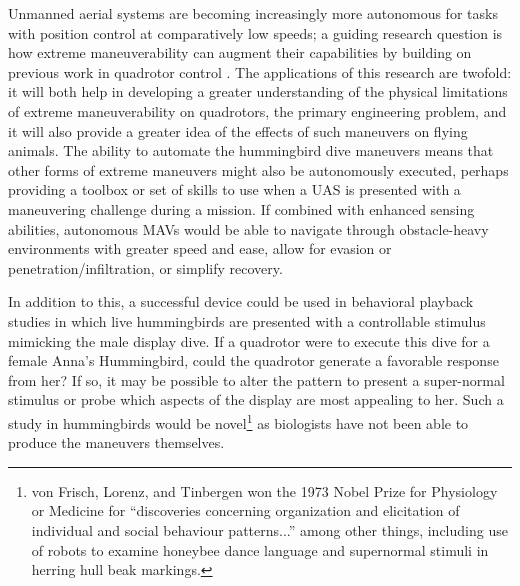 Unmanned aerial systems are becoming increasingly more autonomous for tasks with position control at comparatively low speeds; a guiding research question is how extreme maneuverability can augment their capabilities by building on previous work in quadrotor control  \cite{mellinger2011minimum, greiff2017modelling}.  The applications of this research are twofold: it will both help in developing a greater understanding of the physical limitations of extreme maneuverability on quadrotors, the primary engineering problem, and it will also provide a greater idea of the effects of such maneuvers on flying animals. The ability to automate the hummingbird dive maneuvers means that other forms of extreme maneuvers might also be autonomously executed, perhaps providing a toolbox or set of skills to use when a UAS is presented with a maneuvering challenge during a mission.  If combined with enhanced sensing abilities, autonomous MAVs would be able to navigate through obstacle-heavy environments with greater speed and ease, allow for evasion or penetration/infiltration, or simplify recovery. 

In addition to this, a successful device could be used in behavioral playback studies in which live hummingbirds are presented with a controllable stimulus mimicking the male display dive.  If a quadrotor were to execute this dive for a female Anna's Hummingbird, could the quadrotor generate a favorable response from her? If so, it may be possible to alter the pattern to present a super-normal stimulus or probe which aspects of the display are most appealing to her.  Such a study in hummingbirds would be novel\footnote{von Frisch, Lorenz, and Tinbergen won the 1973 Nobel Prize for Physiology or Medicine for ``discoveries concerning organization and elicitation of individual and social behaviour patterns...'' among other things, including use of robots to examine honeybee dance language and supernormal stimuli in herring hull beak markings.}  as biologists have not been able to produce the maneuvers themselves.

